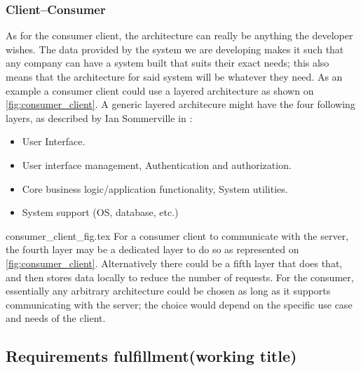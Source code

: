 \subsubsection{Client--Consumer}
As for the consumer client, the architecture can really be anything the developer wishes.
The data provided by the system we are developing makes it such that any company can have a system built that suits their exact needs; this also means that the architecture for said system will be whatever they need.
As an example a consumer client could use a layered architecture as shown on \cref{fig:consumer_client}.
A generic layered architecure might have the four following layers, as described by Ian Sommerville in \cite{software_engineering}:
\begin{itemize}
    \item User Interface.
    \item User interface management, Authentication and authorization.
    \item Core business logic/application functionality, System utilities.
    \item System support (OS, database, etc.)
\end{itemize}
{consumer_client_fig.tex}
For a consumer client to communicate with the server, the fourth layer may be a dedicated layer to do so as represented on \cref{fig:consumer_client}.
Alternatively there could be a fifth layer that does that, and then stores data locally to reduce the number of requests.
For the consumer, essentially any arbitrary architecture could be chosen as long as it supports communicating with the server; the choice would depend on the specific use case and needs of the client.

\subsection{Requirements fulfillment(working title)}

